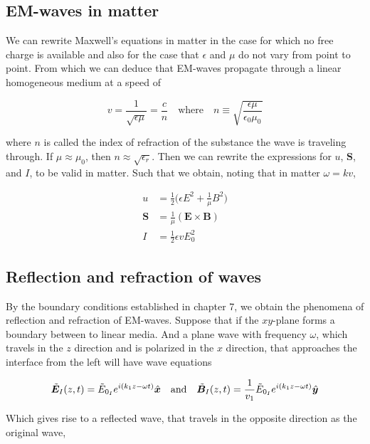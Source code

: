 \documentclass[a4paper]{article}
\begin{document}
\subsection{EM-waves in matter}

We can rewrite Maxwell's equations in matter in the case for which no free charge is available and also for the case that $\epsilon$ and $\mu$ do not vary from point to point. From which we can deduce that EM-waves propagate through a linear homogeneous medium at a speed of

\begin{equation*}
    v=\frac{1}{\sqrt{\epsilon\mu}}=\frac{c}{n}\quad\text{where}\quad n\equiv\sqrt{\frac{\epsilon\mu}{\epsilon_0\mu_0}}
\end{equation*}

where $n$ is called the index of refraction of the substance the wave is traveling through. If $\mu\approx\mu_0$, then $n\approx\sqrt{\epsilon_r}$. Then we can rewrite the expressions for $u$, $\bm{S}$, and $I$, to be valid in matter. Such that we obtain, noting that in matter $\omega=kv$,

\begin{align*}
    u&=\frac{1}{2}\bigg(\epsilon E^2+\frac{1}{\mu}B^2\bigg)\\[1em]
    \bm{S}&=\frac{1}{\mu}(\bm{E}\times\bm{B})\\[1em]
    I&=\frac{1}{2}\epsilon vE_0^2
\end{align*}

\subsection{Reflection and refraction of waves}

By the boundary conditions established in chapter 7, we obtain the phenomena of reflection and refraction of EM-waves. Suppose that if the $xy$-plane forms a boundary between to linear media. And a plane wave with frequency $\omega$, which travels in the $z$ direction and is polarized in the $x$ direction, that approaches the interface from the left will have wave equations

\begin{align*}
    \Tilde{\bm{E}}_I(z, t) = \Tilde{E}_{0_{I}}e^{i(k_1z-\omega t)}\hat{\bm{x}}\quad\text{and}\quad
    \Tilde{\bm{B}}_I(z, t) = \frac{1}{v_1}\Tilde{E}_{0_{I}}e^{i(k_1z-\omega t)}\hat{\bm{y}}
\end{align*}

Which gives rise to a reflected wave, that travels in the opposite direction as the original wave, 
\end{document}
